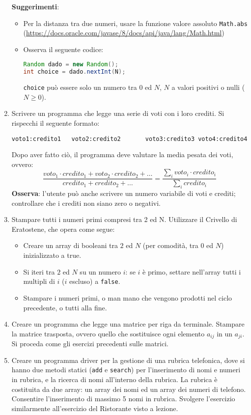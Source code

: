 \documentclass[]{scrartcl}
\begin{document}
\begin{enumerate}
\textbf{Suggerimenti}:
\begin{itemize}
\item Per la distanza tra due numeri, usare la funzione valore assoluto \texttt{Math.abs} (\url{https://docs.oracle.com/javase/8/docs/api/java/lang/Math.html})
\item Osserva il seguente codice:
\begin{lstlisting}[language=Java]
Random dado = new Random();
int choice = dado.nextInt(N);
\end{lstlisting}
\texttt{choice} può essere solo un numero tra $0$ ed $N$, $N$ a valori positivi o nulli ($N\geq 0$).
\end{itemize}
\item   Scrivere un programma che legge una serie di voti con i loro crediti. Si rispecchi il seguente formato:
\begin{lstlisting}
voto1:credito1   voto2:credito2       voto3:credito3 voto4:credito4
\end{lstlisting}
Dopo aver fatto ciò, il programma deve valutare la media pesata dei voti, ovvero:
\[\frac{voto_1\cdot credito_1+voto_2\cdot credito_2+\dots}{credito_1+credito_2+\dots}=\frac{\sum_ivoto_i\cdot credito_i}{\sum_i credito_i}\]
\textbf{Osserva}: l'utente può anche scrivere un numero variabile di voti e crediti; controllare che i crediti non siano zero o negativi.

\item Stampare tutti i numeri primi compresi tra 2 ed N. Utilizzare il Crivello di Eratostene, che opera come segue:
\begin{itemize}
\item Creare un array di booleani tra $2$ ed $N$ (per comodità, tra $0$ ed $N$) inizializzato a true.
\item Si iteri tra $2$ ed $N$ su un numero $i$: se $i$ è primo, settare nell'array tutti i multipli di $i$ ($i$ escluso) a \texttt{false}.
\item Stampare i numeri primi, o man mano che vengono prodotti nel ciclo precedente, o tutti alla fine.
\end{itemize}
\item Creare un programma che legge una matrice per riga da terminale. Stampare la matrice trasposta, ovvero quello che sostituisce ogni elemento $a_{ij}$ in un $a_{ji}$. Si proceda come gli esercizi precedenti sulle matrici.

\item Creare un programma driver per la gestione di una rubrica telefonica, dove si hanno due metodi statici (\texttt{add} e \texttt{search}) per l'inserimento di nomi e numeri in rubrica, e la ricerca di nomi all'interno della rubrica. La rubrica è costituita da due array: un array dei nomi ed un array dei numeri di telefono. Consentire l'inserimento di massimo 5 nomi in rubrica. Svolgere l'esercizio similarmente all'esercizio del Ristorante visto a lezione.
\end{enumerate}
\end{document}
